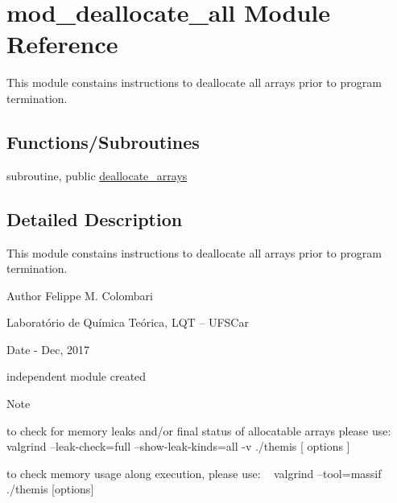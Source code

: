 \hypertarget{namespacemod__deallocate__all}{}\section{mod\+\_\+deallocate\+\_\+all Module Reference}
\label{namespacemod__deallocate__all}


This module constains instructions to deallocate all arrays prior to program termination.  


\subsection*{Functions/\+Subroutines}
\begin{DoxyCompactItemize}
\item 
subroutine, public \hyperlink{namespacemod__deallocate__all_a03994854d5404353882da36b59ca3098}{deallocate\+\_\+arrays}
\end{DoxyCompactItemize}


\subsection{Detailed Description}
This module constains instructions to deallocate all arrays prior to program termination. 

\begin{DoxyAuthor}{Author}
Felippe M. Colombari
\begin{DoxyItemize}
\item Laboratório de Química Teórica, L\+QT -- U\+F\+S\+Car 
\end{DoxyItemize}
\end{DoxyAuthor}
\begin{DoxyDate}{Date}
-\/ Dec, 2017
\begin{DoxyItemize}
\item independent module created 
\end{DoxyItemize}
\end{DoxyDate}
\begin{DoxyNote}{Note}

\begin{DoxyItemize}
\item to check for memory leaks and/or final status of allocatable arrays please use\+: ~\newline
 valgrind --leak-\/check=full --show-\/leak-\/kinds=all -\/v ./themis \mbox{[} options \mbox{]}
\item to check memory usage along execution, please use\+: ~\newline
 valgrind --tool=massif ./themis \mbox{[}options\mbox{]} 
\end{DoxyItemize}
\end{DoxyNote}


